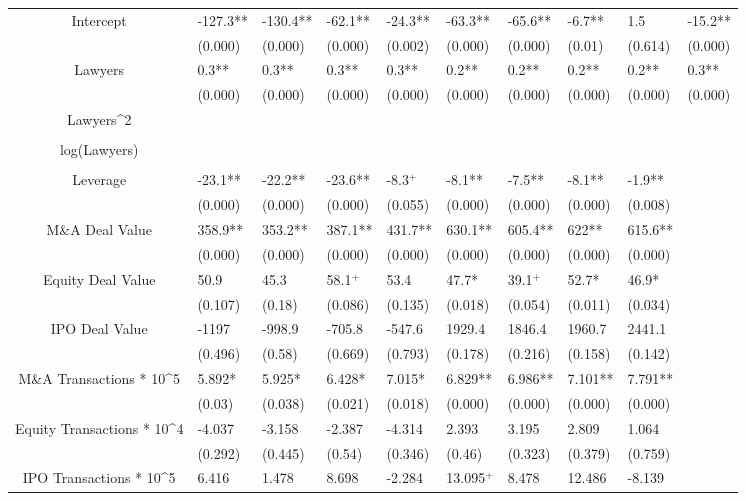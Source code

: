 \documentclass{article}
\begin{document}
\begin{table}[H]
\begin{tabular}{|clllllllll|}
Intercept & -127.3** & -130.4** & -62.1** & -24.3** & -63.3** & -65.6** & -6.7** & 1.5 & -15.2** \\ 
   & (0.000) & (0.000) & (0.000) & (0.002) & (0.000) & (0.000) & (0.01) & (0.614) & (0.000) \\ 
  Lawyers & 0.3** & 0.3** & 0.3** & 0.3** & 0.2** & 0.2** & 0.2** & 0.2** & 0.3** \\ 
   & (0.000) & (0.000) & (0.000) & (0.000) & (0.000) & (0.000) & (0.000) & (0.000) & (0.000) \\ 
  Lawyers^2 &  &  &  &  &  &  &  &  &  \\ 
   &  &  &  &  &  &  &  &  &  \\ 
  log(Lawyers) &  &  &  &  &  &  &  &  &  \\ 
   &  &  &  &  &  &  &  &  &  \\ 
  Leverage & -23.1** & -22.2** & -23.6** & -8.3$^{+}$ & -8.1** & -7.5** & -8.1** & -1.9** &  \\ 
   & (0.000) & (0.000) & (0.000) & (0.055) & (0.000) & (0.000) & (0.000) & (0.008) &  \\ 
  M\&A Deal Value & 358.9** & 353.2** & 387.1** & 431.7** & 630.1** & 605.4** & 622** & 615.6** &  \\ 
   & (0.000) & (0.000) & (0.000) & (0.000) & (0.000) & (0.000) & (0.000) & (0.000) &  \\ 
  Equity Deal Value & 50.9 & 45.3 & 58.1$^{+}$ & 53.4 & 47.7* & 39.1$^{+}$ & 52.7* & 46.9* &  \\ 
   & (0.107) & (0.18) & (0.086) & (0.135) & (0.018) & (0.054) & (0.011) & (0.034) &  \\ 
  IPO Deal Value & -1197 & -998.9 & -705.8 & -547.6 & 1929.4 & 1846.4 & 1960.7 & 2441.1 &  \\ 
   & (0.496) & (0.58) & (0.669) & (0.793) & (0.178) & (0.216) & (0.158) & (0.142) &  \\ 
  M\&A Transactions * 10^5 & 5.892* & 5.925* & 6.428* & 7.015* & 6.829** & 6.986** & 7.101** & 7.791** &  \\ 
   & (0.03) & (0.038) & (0.021) & (0.018) & (0.000) & (0.000) & (0.000) & (0.000) &  \\ 
  Equity Transactions * 10^4 & -4.037 & -3.158 & -2.387 & -4.314 & 2.393 & 3.195 & 2.809 & 1.064 &  \\ 
   & (0.292) & (0.445) & (0.54) & (0.346) & (0.46) & (0.323) & (0.379) & (0.759) &  \\ 
  IPO Transactions * 10^5 & 6.416 & 1.478 & 8.698 & -2.284 & 13.095$^{+}$ & 8.478 & 12.486 & -8.139 &  \\ 

\end{tabular}
\end{table}
\end{document}
